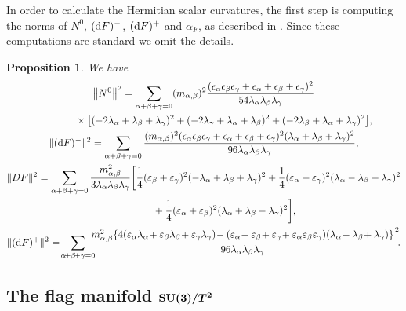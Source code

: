 \documentclass[10pt,a4paper]{amsart}
\numberwithin{equation}{section}
\newtheorem{Proposition}[Theorem]{Proposition}
 { \theoremstyle{definition}
\newtheorem{Definition}[Theorem]{Definition}
\newtheorem{Question}[Theorem]{Question}
\newtheorem*{Notation}{Notation}
\newtheorem{Example}[Theorem]{Example}
\newtheorem{Remark}[Theorem]{Remark} }
\begin{document}
In order to calculate the Hermitian scalar curvatures, the first step is computing the norms of $N^{0}$, $({\rm d}F)^{-}$, $({\rm d}F)^{+}$ and $\alpha_{F}$, as described in \cite{fu}. Since these computations are standard we omit the details.

\begin{Proposition} \label{prop-norma}
We have
\begin{gather*}
\big\|N^{0}\big\|^{2}=\sum_{\alpha+\beta+\gamma=0}(m_{\alpha,\beta})^{2} \dfrac{(\epsilon_{\alpha}\epsilon_{\beta}\epsilon_{\gamma}+\epsilon_{\alpha} +\epsilon_{\beta}+\epsilon_{\gamma})^2}{54\lambda_{\alpha}\lambda_{\beta}\lambda_{\gamma}}
\\ \hphantom{\big\|N^{0}\big\|^{2}=}
{}\times\big[(-2\lambda_{\alpha}+\lambda_{\beta}+\lambda_{\gamma})^{2}+ (-2\lambda_{\gamma}+\lambda_{\alpha}+\lambda_{\beta})^{2}+(-2\lambda_{\beta} +\lambda_{\alpha}+\lambda_{\gamma})^{2}\big],
\\
\|({\rm d}F)^{-}\|^{2}=\sum_{\alpha+\beta+\gamma=0}\dfrac{(m_{\alpha,\beta})^{2} (\epsilon_{\alpha}\epsilon_{\beta}\epsilon_{\gamma}+\epsilon_{\alpha}+\epsilon_{\beta}+\epsilon_{\gamma} )^2(\lambda_{\alpha}+\lambda_{\beta}+\lambda_{\gamma})^{2}} {96\lambda_{\alpha}\lambda_{\beta}\lambda_{\gamma}},
\\
\|DF\|^{2}=\sum_{\alpha+\beta+\gamma=0}\dfrac{m_{\alpha,\beta}^{2}}{3\lambda_{\alpha}\lambda_{\beta} \lambda_{\gamma}}\bigg[\dfrac{1}{4}(\varepsilon_{\beta}+\varepsilon_{\gamma})^{2} (-\lambda_{\alpha}+\lambda_{\beta}+\lambda_{\gamma})^{2}
+ \dfrac{1}{4}(\varepsilon_{\alpha}+\varepsilon_{\gamma})^{2}(\lambda_{\alpha}-\lambda_{\beta} +\lambda_{\gamma})^{2}
\\ \hphantom{\|DF\|^{2}=}
{}+\dfrac{1}{4}(\varepsilon_{\alpha}+\varepsilon_{\beta})^{2}(\lambda_{\alpha} +\lambda_{\beta}-\lambda_{\gamma})^{2}\bigg],
\\
\|({\rm d}F)^{+}\|^{2}=\!\sum_{\alpha\!+\beta\!+\gamma=0}\!\!\!\!\dfrac{m_{\alpha,\beta}^{2} \{4(\varepsilon_{\alpha}\lambda_{\alpha}\!+\varepsilon_{\beta}\lambda_{\beta} \!+\varepsilon_{\gamma}\lambda_{\gamma})\!-(\varepsilon_{\alpha}\!+\varepsilon_{\beta} \!+\varepsilon_{\gamma}\!+\varepsilon_{\alpha}\varepsilon_{\beta}\varepsilon_{\gamma}) (\lambda_{\alpha}\!+\lambda_{\beta}\!+\lambda_{\gamma})\}} {96\lambda_{\alpha}\lambda_{\beta}\lambda_{\gamma}}^{2}\!.
\end{gather*}
\end{Proposition}

\subsection[The flag manifold SU(3)/T\textasciicircum{}2]
{The flag manifold $\boldsymbol{{\rm SU}(3)/T^{2}}$}
\end{document}
